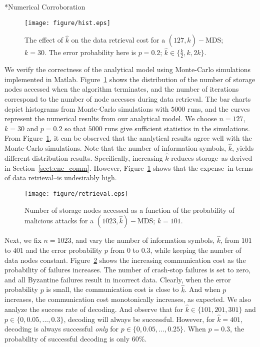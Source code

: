 \documentclass[10pt,journal,letterpaper,compsoc]{IEEEtran}
\makeatletter
\newcommand{\0}{{\bf 0}}
\renewcommand\paragraph{\@startsection{paragraph}{4}{\z@}{1.5ex plus .2ex minus .3ex}{-0em}{\normalsize\bf}}
\makeatother
\begin{document}
\paragraph*{Numerical Corroboration}
\label{sect:num}
\begin{figure}[thp]
\begin{center}
\texttt{[image: figure/hist.eps]}
\caption{The effect of $\hat{k}$ on the data retrieval cost for a  $(127,\hat{k})-$MDS; $k=30$. The error probability here is $p=0.2$; $\hat{k}\in\{\frac{k}{2},k,2k\}$. }
\label{fig:khat}
\end{center}
\end{figure}
We verify the correctness of the analytical model using Monte-Carlo simulations
implemented in Matlab. Figure~\ref{fig:khat} shows the distribution of the number of
storage nodes accessed when the algorithm terminates, and the number of iterations
correspond to the number of node accesses during data retrieval.
The bar charts depict 
histograms from Monte-Carlo simulations with $5000$ runs, and the curves
represent the numerical results from our analytical model. We choose $n = 127$, $k=30$ and $p =
0.2$ so that $5000$ runs give sufficient statistics in the simulations. From Figure~\ref{fig:khat},
it can be observed that the analytical results agree well with the Monte-Carlo simulations.
Note that the number of information symbols, $\hat{k}$, yields different distribution results.
Specifically, increasing $\hat{k}$ reduces storage--as derived in Section~\ref{sect:enc_comm}.
However, Figure~\ref{fig:khat} shows that the expense--in terms of data retrieval--is undesirably high.
\begin{figure}[thp]
\begin{center}
\texttt{[image: figure/retrieval.eps]} 
\caption{Number of storage nodes accessed as a function of the probability of malicious attacks for a $(1023,\hat{k})-$MDS; $k = 101$.}
\label{fig:ret}
\end{center}
\end{figure}

Next, we fix $n = 1023$, and vary the number of information symbols, $\hat{k}$, from
$101$ to $401$ and the error probability $p$ from $0$ to $0.3$, while keeping the number
of data nodes constant.
Figure~\ref{fig:ret} shows the increasing communication cost as the
probability of failures increases. The number of crash-stop failures is set to
zero, and all Byzantine failures result in incorrect data.  Clearly, when the
error probability $p$ is small, the communication cost is close to $\hat{k}$. And when $p$ increases, the
communication cost monotonically increases, as expected. We also analyze the success rate of decoding. And observe
that for $\hat{k}\in\{101,201,301\}$ and $p\in\{0,0.05,...,0.3\}$, decoding will always be successful. However, for $\hat{k}=401$, decoding is always successful \emph{only} for $p\in\{0,0.05,...,0.25\}$. When $p=0.3$, the probability of successful decoding is only $60\%$.
\end{document}
